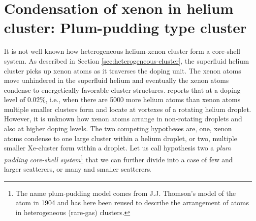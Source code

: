 \section{Condensation of xenon in helium cluster: Plum-pudding type cluster}\label{sec:helium-data}
It is not well known how heterogeneous helium-xenon cluster form a core-shell system. As described in Section \ref{sec:heterogeneous-cluster}, the superfluid helium cluster picks up xenon atoms as it traverses the doping unit. The xenon atoms move unhindered in the superfluid helium and eventually the xenon atoms condense to energetically favorable cluster structures. \citep{Gomez-2014-Science} reports that at a doping level of $0.02\%$, i.e., when there are 5000 more helium atoms than xenon atoms multiple smaller clusters form and locate at vortexes of a rotating helium droplet. However, it is unknown how xenon atoms arrange in non-rotating droplets and also at higher doping levels. The two competing hypotheses are, one, xenon atoms condense to one large cluster within a helium droplet, or two, multiple smaller Xe-cluster form within a droplet. Let us call hypothesis two a \textit{plum pudding core-shell system}\footnote{The name plum-pudding model comes from J.J. Thomson's model of the atom in 1904 and has here been reused to describe the arrangement of atoms in heterogeneous (rare-gas) clusters.} that we can further divide into a case of few and larger scatterers, or many and smaller scatterers.\\
